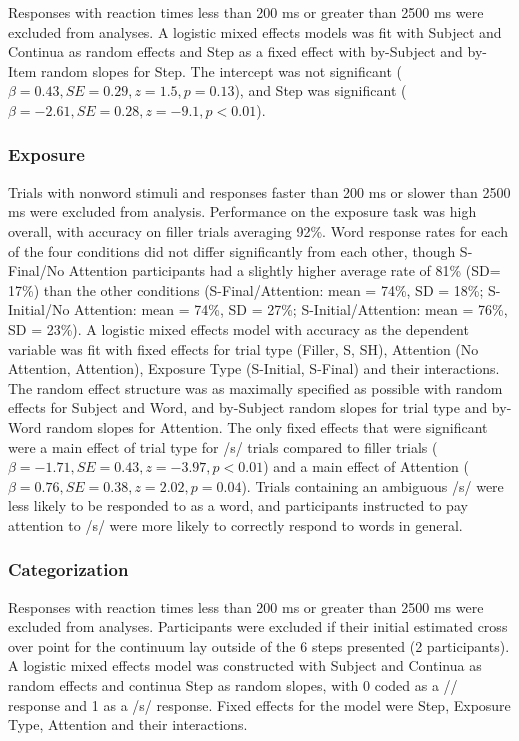 \documentclass[11pt]{article}\usepackage[]{graphicx}\usepackage[]{color}
\begin{document}
Responses with reaction times less than 200 ms or greater than 2500 ms were excluded from analyses. 
A logistic mixed effects models was fit with Subject and Continua as random effects and Step as a fixed effect with by-Subject and by-Item random slopes for Step. 
The intercept was not significant ($\beta = 0.43, SE = 0.29, z = 1.5, p = 0.13$), and Step was significant ($\beta = -2.61, SE = 0.28, z = -9.1, p < 0.01$).

\subsubsection{Exposure}

Trials with nonword stimuli and responses faster than 200 ms or slower than 2500 ms were excluded from analysis. 
Performance on the exposure task was high overall, with accuracy on filler trials averaging 92\%.  
Word response rates for each of the four conditions did not differ significantly from each other, though S-Final/No Attention participants had a slightly higher average rate of 81\% (SD= 17\%) than the other conditions (S-Final/Attention: mean = 74\%, SD = 18\%; S-Initial/No Attention: mean = 74\%, SD = 27\%; S-Initial/Attention: mean = 76\%, SD = 23\%). 
A logistic mixed effects model with accuracy as the dependent variable was fit with fixed effects for trial type (Filler, S, SH), Attention (No Attention, Attention), Exposure Type (S-Initial, S-Final) and their interactions. 
The random effect structure was as maximally specified as possible with random effects for Subject and Word, and by-Subject random slopes for trial type and by-Word random slopes for Attention. 
The only fixed effects that were significant were a main effect of trial type for /s/ trials compared to filler trials ($\beta = -1.71, SE = 0.43, z = -3.97, p < 0.01$) and a main effect of Attention ($\beta = 0.76, SE = 0.38, z = 2.02,   p = 0.04$).  
Trials containing an ambiguous /s/ were less likely to be responded to as a word, and participants instructed to pay attention to /s/ were more likely to correctly respond to words in general.

\subsubsection{Categorization}

Responses with reaction times less than 200 ms or greater than 2500 ms were excluded from analyses. 
Participants were excluded if their initial estimated cross over point for the continuum lay outside of the 6 steps presented (2 participants).  
A logistic mixed effects model was constructed with Subject and Continua as random effects and continua Step as random slopes, with 0 coded as a /\textesh/ response and 1 as a /s/ response.  Fixed effects for the model were Step, Exposure Type, Attention and their interactions.
\end{document}
